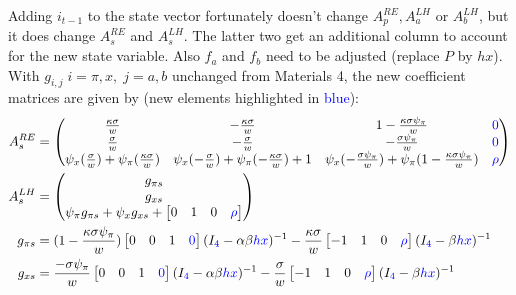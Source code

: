 \documentclass[11pt]{article}
\renewcommand{\[}{\begin{equation}}
\renewcommand{\]}{\end{equation}}
\begin{document}
Adding $i_{t-1}$ to the state vector fortunately doesn't change $A^{RE}_p, A^{LH}_a$ or $A^{LH}_b$, but it does change $A^{RE}_s$ and $A^{LH}_s$. The latter two get an additional column to account for the new state variable. Also $f_a$ and $f_b$ need to be adjusted (replace $P$ by $hx$). With $g_{i, j} \; i=\pi,x, \; j=a,b$ unchanged from Materials 4, the new coefficient matrices are given by (new elements highlighted in \textcolor{blue}{blue}):
\begin{align}
A_s^{RE} &= \begin{pmatrix}   \frac{\kappa\sigma}{w}  &-\frac{\kappa\sigma}{w}  & 1-\frac{\kappa\sigma\psi_{\pi}}{w} & \textcolor{blue}{0}\\
 \frac{ \sigma}{w} &  -\frac{\sigma}{w} & -\frac{\sigma\psi_{\pi}}{w} & \textcolor{blue}{0}\\ 
 \psi_x( \frac{\sigma}{w}) + \psi_{\pi}( \frac{\kappa\sigma}{w}) & \psi_x(- \frac{\sigma}{w}) + \psi_{\pi}(- \frac{\kappa\sigma}{w}) +1 &  \psi_x(-\frac{\sigma\psi_{\pi}}{w}) + \psi_{\pi}( 1-\frac{\kappa\sigma\psi_{\pi}}{w}) & \textcolor{blue}{\rho}\end{pmatrix}  
\\
 A_s^{LH} & = \begin{pmatrix} g_{\pi s} \\ g_{x s} \\ \psi_{\pi}g_{\pi s} + \psi_xg_{x s} + \begin{bmatrix} 0 & 1& 0 & \textcolor{blue}{\rho}\end{bmatrix}
\end{pmatrix} \\
g_{\pi s} & = (1-\frac{\kappa\sigma\psi_{\pi}}{w} )\begin{bmatrix} 0&0&1 & \textcolor{blue}{0}\end{bmatrix} (I_{\textcolor{blue}{4}} - \alpha\beta \textcolor{blue}{hx})^{-1} -\frac{\kappa\sigma}{w}\begin{bmatrix} -1&1&0 & \textcolor{blue}{\rho} \end{bmatrix} (I_{\textcolor{blue}{4}} -\beta \textcolor{blue}{hx})^{-1}\\
g_{x s} & =  \frac{-\sigma\psi_{\pi}}{w} \begin{bmatrix} 0&0&1& \textcolor{blue}{0} \end{bmatrix}(I_{\textcolor{blue}{4}} - \alpha\beta \textcolor{blue}{hx})^{-1}  -\frac{\sigma}{w}\begin{bmatrix} -1&1&0 & \textcolor{blue}{\rho}\end{bmatrix}(I_{\textcolor{blue}{4}} -\beta \textcolor{blue}{hx})^{-1}
\end{align}
\end{document}
